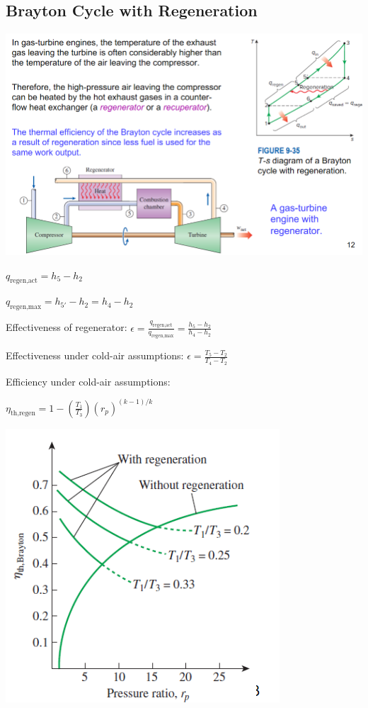 \documentclass{article}
\begin{document}
\begin{multicols}{3}
    \subsection*{Brayton Cycle with Regeneration}
    \includegraphics[width=\linewidth]{Images/Brayton_regen.png}\par 
    $q_\text{regen,act}=h_5-h_2$\par 
    $q_\text{regen,max}=h_{5'}-h_2=h_4-h_2$\par 
    Effectiveness of regenerator: $\epsilon=\frac{q_\text{regen,act}}{q_\text{regen,max}}=\frac{h_5-h_2}{h_4-h_2}$\par 
    Effectiveness under cold-air assumptions: $\epsilon=\frac{T_5-T_2}{T_4-T_2}$\par 
    Efficiency under cold-air assumptions:\par $\eta_\text{th,regen}=1-\left(\frac{T_1}{T_3}\right)(r_p)^{(k-1)/k}$\par
    \includegraphics[width=0.5\linewidth]{Images/regen.png}

\end{multicols}
\end{document}
